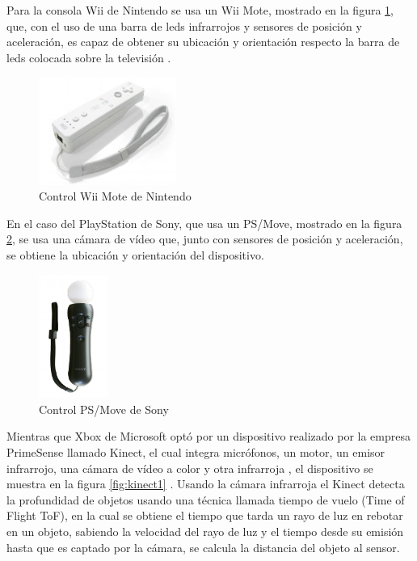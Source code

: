 Para la consola Wii de Nintendo se usa un Wii Mote, mostrado en la figura \ref{fig:WiiMote}, que, con el uso de una barra de leds infrarrojos y sensores de posición y aceleración, es capaz de obtener su ubicación y orientación respecto la barra de leds colocada sobre la televisión \cite{UsodelKi56:online}.\\
\begin{figure}[!htb]
	\centering
	\includegraphics[width=0.4\textwidth]{01Introduccion/imagenes/wiiMote.JPG}
	\caption{Control Wii Mote de Nintendo} 
	\label{fig:WiiMote}
\end{figure}


En el caso del PlayStation de Sony, que usa un PS/Move, mostrado en la figura \ref{fig:psMove}, se usa una cámara de vídeo que, junto con sensores de posición y aceleración, se obtiene la ubicación y orientación del dispositivo.\\

\begin{figure}[!htb]
	\centering
	\includegraphics[width=0.2\textwidth]{01Introduccion/imagenes/PsMove.JPG}
	\caption{Control PS/Move de Sony} 
	\label{fig:psMove}
\end{figure}

Mientras que Xbox de Microsoft optó por un dispositivo realizado por la empresa PrimeSense llamado Kinect, el cual integra micrófonos, un motor, un emisor infrarrojo, una cámara de vídeo a color y otra infrarroja \cite{UsodelKi56:online}, el dispositivo se muestra en la figura \ref{fig:kinect1} \cite{Microsof29:online}. Usando la cámara infrarroja el Kinect detecta la profundidad de objetos usando una técnica llamada tiempo de vuelo (Time of Flight ToF), en la cual se obtiene el tiempo que tarda un rayo de luz en rebotar en un objeto, sabiendo la velocidad del rayo de luz y el tiempo desde su emisión hasta que es captado por la cámara, se calcula la distancia del objeto al sensor\cite{Lachat2015}.\\

